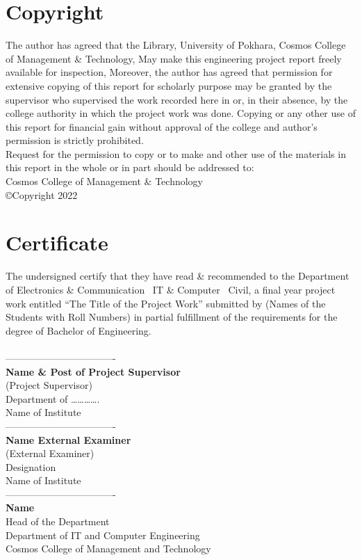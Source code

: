 \documentclass[12pt,a4paper]{report}
\begin{document}
\setcounter{page}{2}
\newpage
\chapter*{Copyright}
The author has agreed that the Library, University of Pokhara, Cosmos College of Management \& Technology, May make this engineering project report freely available for inspection, Moreover, the author has agreed that permission for extensive copying of this report for scholarly purpose may be granted by the supervisor who supervised the work recorded here in or, in their absence, by the college authority in which the project work was done. Copying or any other use of this report for financial gain without approval of the college and author’s permission is strictly prohibited.\\
Request for the permission to copy or to make and other use of the materials in this report in the whole or in part should be addressed to:
\vspace{50pt}\\
Cosmos College of Management \& Technology\\
©Copyright 2022
\chapter*{Certificate}
\vspace{20pt}
The undersigned certify that they have read \& recommended to the Department of Electronics \& Communication \ IT \& Computer \ Civil, a final year project work entitled “The Title of the Project Work” submitted by (Names of the Students with Roll Numbers) in partial fulfillment of the requirements for the degree of Bachelor of Engineering.\\
\vspace{60pt}\\
----------------------------------\\
\textbf{Name \& Post of Project Supervisor}\\
(Project Supervisor)\\
Department of ………….\\
Name of Institute\\
\newline
\newline
----------------------------------\\
\textbf{Name External Examiner}\\
(External Examiner)\\
Designation\\
Name of Institute\\
\newline
\newline
----------------------------------\\
\textbf{Name}\\
Head of the Department\\
Department of IT and Computer Engineering\\
Cosmos College of Management and Technology\\
\end{document}
